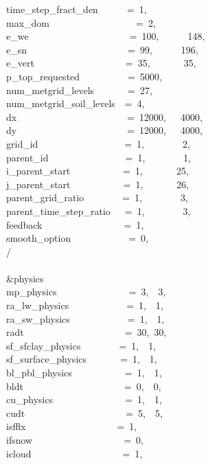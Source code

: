 time\_step\_fract\_den~~~~~~=~1,\\
max\_dom~~~~~~~~~~~~~~~~~~=~2,\\
e\_we~~~~~~~~~~~~~~~~~~~~~=~100,~~~~~~148,~~~~\\
e\_sn~~~~~~~~~~~~~~~~~~~~~=~99,~~~~~~196,~~~~\\
e\_vert~~~~~~~~~~~~~~~~~~~=~35,~~~~~~~35,~~~~\\
p\_top\_requested~~~~~~~~~~=~5000,\\
num\_metgrid\_levels~~~~~~~=~27,\\
num\_metgrid\_soil\_levels~~=~4,\\
dx~~~~~~~~~~~~~~~~~~~~~~~=~12000,~~~4000,\\
dy~~~~~~~~~~~~~~~~~~~~~~~=~12000,~~~4000,\\
grid\_id~~~~~~~~~~~~~~~~~~=~1,~~~~~~~~2,~~~~~~\\
parent\_id~~~~~~~~~~~~~~~~=~1,~~~~~~~~1,~~~~~~\\
i\_parent\_start~~~~~~~~~~~=~1,~~~~~~~25,~~~~~~\\
j\_parent\_start~~~~~~~~~~~=~1,~~~~~~~26,~~~~~~\\
parent\_grid\_ratio~~~~~~~~=~1,~~~~~~~~3,~~~~~~\\
parent\_time\_step\_ratio~~~=~1,~~~~~~~~3,~~~~~~\\
feedback~~~~~~~~~~~~~~~~~=~1,\\
smooth\_option~~~~~~~~~~~~=~0,\\
/\\
\\
\&physics~~~~~~~~~~~~~~~~~\\
mp\_physics~~~~~~~~~~~~~~~=~3,~~3,~\\
ra\_lw\_physics~~~~~~~~~~~~=~1,~~1,~\\
ra\_sw\_physics~~~~~~~~~~~~=~1,~~1,~\\
radt~~~~~~~~~~~~~~~~~~~~~=~30,~30,\\
sf\_sfclay\_physics~~~~~~~~=~1,~~1,~\\
sf\_surface\_physics~~~~~~~=~1,~~1,~\\
bl\_pbl\_physics~~~~~~~~~~~=~1,~~1,~\\
bldt~~~~~~~~~~~~~~~~~~~~~=~0,~~0,~\\
cu\_physics~~~~~~~~~~~~~~~=~1,~~1,~\\
cudt~~~~~~~~~~~~~~~~~~~~~=~5,~~5,~\\
isfflx~~~~~~~~~~~~~~~~~~~=~1,\\
ifsnow~~~~~~~~~~~~~~~~~~~=~0,\\
icloud~~~~~~~~~~~~~~~~~~~=~1,\\
